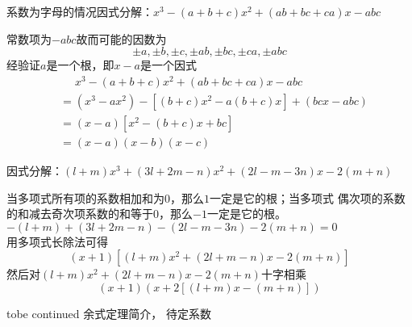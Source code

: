 \documentclass[windows,csize4,answers]{BHCexam}
\begin{document}
\begin{groups}
\begin{questions}[]
        \question[5] 系数为字母的情况因式分解：$x^3-(a+b+c)x^2+(ab+bc+ca)x-abc$
        \begin{solution}{0.5cm}
            \methodonly 常数项为$-abc$故而可能的因数为
            \[\pm a, \pm b, \pm c, \pm ab, \pm bc, \pm ca, \pm abc \]
            经验证$a$是一个根，即$x-a$是一个因式
            \[
                \begin{aligned}
                     & \phantom{=} x^3-(a+b+c)x^2+(ab+bc+ca)x-abc \\
                     & =(x^3-ax^2)-[(b+c)x^2-a(b+c)x]+(bcx-abc)   \\
                     & =(x-a)[x^2-(b+c)x+bc]                      \\
                     & =(x-a)(x-b)(x-c)
                \end{aligned}
            \]
        \end{solution}

        \question[5] 因式分解：$(l+m)x^3+(3l+2m-n)x^2+(2l-m-3n)x-2(m+n)$
        \begin{solution}{0.5cm}
            \methodonly 当多项式所有项的系数相加和为$0$，那么$1$一定是它的根；当多项式
            偶次项的系数的和减去奇次项系数的和等于$0$，那么$-1$一定是它的根。
            $-(l+m)+(3l+2m-n)-(2l-m-3n)-2(m+n)=0$ \\ 
            用多项式长除法可得
            \[
                (x+1)[(l+m)x^2+(2l+m-n)x-2(m+n)]
            \]
            然后对$(l+m)x^2+(2l+m-n)x-2(m+n)$十字相乘 \\ 
            \[
                (x+1)(x+2[(l+m)x-(m+n)])
            \]

        \end{solution}

        tobe continued
        余式定理简介， 
        待定系数

    \end{questions}
\end{groups}

\label{lastpage}
\end{document}
